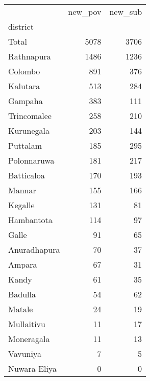 \begin{tabular}{lrr}
\toprule
{} &  new\_pov &  new\_sub \\
district     &          &          \\
\midrule
Total        &     5078 &     3706 \\
Rathnapura   &     1486 &     1236 \\
Colombo      &      891 &      376 \\
Kalutara     &      513 &      284 \\
Gampaha      &      383 &      111 \\
Trincomalee  &      258 &      210 \\
Kurunegala   &      203 &      144 \\
Puttalam     &      185 &      295 \\
Polonnaruwa  &      181 &      217 \\
Batticaloa   &      170 &      193 \\
Mannar       &      155 &      166 \\
Kegalle      &      131 &       81 \\
Hambantota   &      114 &       97 \\
Galle        &       91 &       65 \\
Anuradhapura &       70 &       37 \\
Ampara       &       67 &       31 \\
Kandy        &       61 &       35 \\
Badulla      &       54 &       62 \\
Matale       &       24 &       19 \\
Mullaitivu   &       11 &       17 \\
Moneragala   &       11 &       13 \\
Vavuniya     &        7 &        5 \\
Nuwara Eliya &        0 &        0 \\
\bottomrule
\end{tabular}
